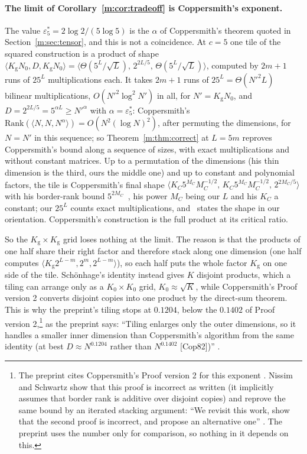 \documentclass[11pt]{article}
\theoremstyle{definition}
\theoremstyle{remark}
\newcommand{\Nz}{N_0}
\newcommand{\Kg}{K_{\mathrm g}}
\newcommand{\es}{\varepsilon^*_5}
\begin{document}
\paragraph{The limit of Corollary~\ref{m:cor:tradeoff} is Coppersmith's exponent.} The value $\es=2\log2/(5\log5)$ is the $\alpha$ of Coppersmith's theorem quoted in Section~\ref{m:sec:tensor}, and this is not a coincidence. At $c=5$ one tile of the squared construction is a product of shape $\langle\Kg\Nz,D,\Kg\Nz\rangle=\langle\Theta(5^L/\sqrt L),\,2^{2L/5},\,\Theta(5^L/\sqrt L)\rangle$, computed by $2m+1$ runs of $25^L$ multiplications each. It takes $2m+1$ runs of $25^L=\Theta(N'^2L)$ bilinear multiplications, $O(N'^2\log^2N')$ in all, for $N'=\Kg\Nz$, and $D=2^{2L/5}=5^{\alpha L}\ge N'^\alpha$ with $\alpha=\es$: Coppersmith's $\mathrm{Rank}(\langle N,N,N^\alpha\rangle)=O(N^2(\log N)^2)$, after permuting the dimensions, for $N=N'$ in this sequence; so Theorem~\ref{m:thm:correct} at $L=5m$ reproves Coppersmith's bound along a sequence of sizes, with exact multiplications and without constant matrices. Up to a permutation of the dimensions (his thin dimension is the third, ours the middle one) and up to constant and polynomial factors, the tile is Coppersmith's final shape $\langle K_C5^{M_C}M_C^{-1/2},\,K_C5^{M_C}M_C^{-1/2},\,2^{2M_C/5}\rangle$ with his border-rank bound $5^{2M_C}$~\cite[p.~469]{Cop82}, his power $M_C$ being our $L$ and his $K_C$ a constant; our $25^L$ counts exact multiplications, and~\cite{LG17} states the shape in our orientation. Coppersmith's construction is the full product at its critical ratio.

So the $\Kg\times\Kg$ grid loses nothing at the limit. The reason is that the products of one half share their right factor and therefore stack along one dimension (one half computes $\langle\Kg2^{L-m},2^m,2^{L-m}\rangle$), so each half puts the whole factor $\Kg$ on one side of the tile. Schönhage's identity instead gives $K$ disjoint products, which a tiling can arrange only as a $K_0\times K_0$ grid, $K_0\approx\sqrt K$, while Coppersmith's Proof version 2 converts disjoint copies into one product by the direct-sum theorem. This is why the preprint's tiling stops at $0.1204$, below the $0.1402$ of Proof version 2,\footnote{The preprint cites Coppersmith's Proof version 2 for this exponent \cite[Sections 2.3 and 2.3.4]{ZT}. Nissim and Schwartz show that this proof is incorrect as written (it implicitly assumes that border rank is additive over disjoint copies) and reprove the same bound by an iterated stacking argument: ``We revisit this work, show that the second proof is incorrect, and propose an alternative one'' \cite{NS24}. The preprint uses the number only for comparison, so nothing in it depends on this.} as the preprint says: ``Tiling enlarges only the outer dimensions, so it handles a smaller inner dimension than Coppersmith's algorithm from the same identity (at best $D\approx N^{0.1204}$ rather than $N^{0.1402}$ [Cop82])'' \cite[Section 2.3.4]{ZT}.
\end{document}
